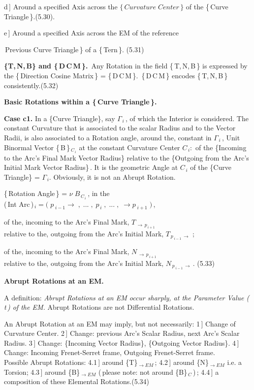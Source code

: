 \documentclass[12pt]{article} %
\begin{document}
\noindent d\,] Around a specified Axis across the ${\{\,Curvature\;Center\,\}}$ of the \{\,Curve Triangle\,\}.\qquad(5.30). 

\noindent e\,] Around a specified Axis across the EM of the reference \ {\,Previous Curve Triangle\,\} of a \{\,Tern\,\}. \qquad (5.31)
           
\noindent \textbf{\{T,\,N,\,B\} and \{\,D\,C\,M\,\}.} \,Any Rotation in the field \{\,T,\,N,\,B\,\} is expressed by the  \{\,Direction Cosine Matrix\,\} = \{\,D\,C\,M\,\}.\, \{\,D\,C\,M\,\} encodes \{\,T,\,N,\,B\,\} consistently.\qquad(5.32)

\noindent \textbf{Basic Rotations within a \{\,Curve Triangle\,\}.}

\noindent \textbf{Case c1.} In a \{Curve Triangle\}, say $\Gamma_{\,i}$\,, of which the Interior is considered. The constant Curvature that is associated to the scalar Radius and to the Vector Radii, is also associated to a Rotation angle, around the, constant in $\Gamma_{\,i}$\,, Unit Binormal Vector \{\,B\,\}$_{\,C_{\,i}}$ at the constant Curvature Center $C_{\,i}$:\, of the \{Incoming to the Arc's Final Mark Vector Radius\} relative to the \{Outgoing from the Arc's Initial Mark Vector Radius\}\,. It is the geometric Angle at $C_{\,i}$ of the \{Curve Triangle\} = $\Gamma_{\,i}$. Obviously, it is not an Abrupt Rotation.

\noindent \{\,Rotation Angle\,\} = $\nu\;B_{\,C_{\,i}}$\,, in the\\ \big(\,Int Arc\,\big)$_{\,i} = \big(\;p_{\;i-1}\to\;,\;...\;,\;p_{\,i}\;,\;...\;,\;\to p_{\;i+1}\;\big)$\,,

\noindent of the, incoming to the Arc's Final Mark, $T_{\,\to\,p_{\,i+1}}$\\ relative to the, outgoing from the Arc's Initial Mark, $T_{\,p_{\;i-1}\,\to}$ \;;

\noindent of the, incoming to the Arc's Final Mark, $N_{\,\to\,p_{\,i+1}}$\\ relative to the, outgoing from the Arc's Initial Mark, $N_{\,p_{\;i-1}\,\to}$\,. \qquad \qquad (5.33) 

\noindent \textbf{Abrupt Rotations at an EM.}

\noindent A definition: \textsl{Abrupt Rotations at an EM occur sharply, at the Parameter Value (\,t\,) of the EM.} \; Abrupt Rotations are not Differential Rotations.

\noindent An Abrupt Rotation at an EM may imply, but not necessarily: 1\,] Change of Curvature Center. 2\,] Change: previous Arc's Scalar Radius, next Arc's Scalar Radius. 3\,] Change: \{Incoming Vector Radius\}, \{Outgoing  Vector Radius\}. 4\,] Change: Incoming Frenet-Serret frame, Outgoing Frenet-Serret frame.\\ Possible Abrupt Rotations: 4.1\,] around \{T\}$_{\to EM}$\,; 4.2\,] around \{N\}$_{\to EM}$ i.e. a Torsion; 4.3\,] around \{B\}$_{\to EM}$ (\,please note: not around \{B\}$_{\,C}$\,)\,; 4.4\,] a composition of these Elemental Rotations.\qquad (5.34) 

}
\end{document}
